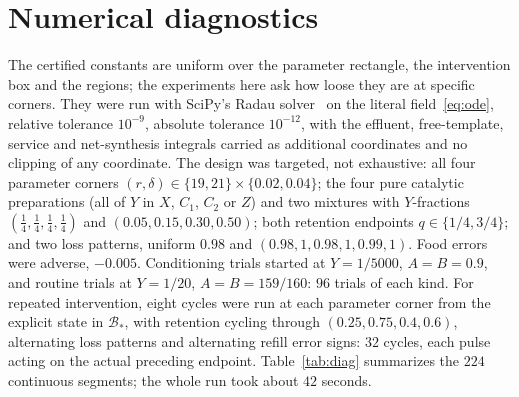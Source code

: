 \documentclass[11pt,a4paper]{article}
\theoremstyle{plain}
\theoremstyle{definition}
\theoremstyle{remark}
\newcommand{\Bstar}{\mathcal B_*}
\begin{document}
\section{Numerical diagnostics}\label{sec:diagnostics}
The certified constants are uniform over the parameter rectangle, the intervention box and the regions; the experiments here ask how loose they are at specific corners. They were run with SciPy's Radau solver~\citep{hairer1996,virtanen2020} on the literal field~\eqref{eq:ode}, relative tolerance $10^{-9}$, absolute tolerance $10^{-12}$, with the effluent, free-template, service and net-synthesis integrals carried as additional coordinates and no clipping of any coordinate. The design was targeted, not exhaustive: all four parameter corners $(r,\delta)\in\{19,21\}\times\{0.02,0.04\}$; the four pure catalytic preparations (all of $Y$ in $X$, $C_1$, $C_2$ or $Z$) and two mixtures with $Y$-fractions $(\tfrac14,\tfrac14,\tfrac14,\tfrac14)$ and $(0.05,0.15,0.30,0.50)$; both retention endpoints $q\in\{1/4,3/4\}$; and two loss patterns, uniform $0.98$ and $(0.98,1,0.98,1,0.99,1)$. Food errors were adverse, $-0.005$. Conditioning trials started at $Y=1/5000$, $A=B=0.9$, and routine trials at $Y=1/20$, $A=B=159/160$: $96$ trials of each kind. For repeated intervention, eight cycles were run at each parameter corner from the explicit state in $\Bstar$, with retention cycling through $(0.25,0.75,0.4,0.6)$, alternating loss patterns and alternating refill error signs: $32$ cycles, each pulse acting on the actual preceding endpoint. Table~\ref{tab:diag} summarizes the $224$ continuous segments; the whole run took about $42$ seconds.
\end{document}
